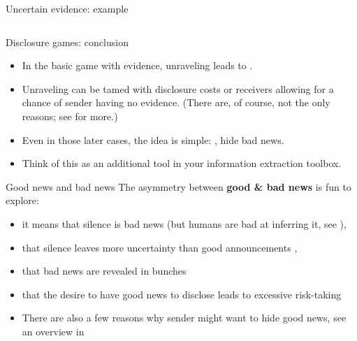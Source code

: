 \documentclass[english,10pt
,aspectratio=169
]{beamer}
\begin{document}
\begin{frame}{Uncertain evidence: example}
\begin{columns}
\begin{column}{0.4\linewidth}
	\end{column}
\end{columns}
\end{frame}


\begin{frame}{Disclosure games: conclusion}
\begin{itemize}
	\item In the basic game with evidence, unraveling leads to .
	\item Unraveling can be tamed with disclosure costs or receivers allowing for a chance of sender having no evidence. (There are, of course, not the only reasons; see \cite{dranove_quality_2010} for more.)
	\item Even in those later cases, the idea is simple: , \alert{hide bad news}.
	\item Think of this as an additional tool in your information extraction toolbox.
\end{itemize}
\end{frame}


\begin{frame}{Good news and bad news}
	The asymmetry between \textbf{good \& bad news} is fun to explore:
	\begin{itemize}[<+->]
		\item it means that \alert{silence is bad news} (but humans are bad at inferring it, see \cite*{jin_is_2021}), 
		\item that \alert{silence leaves more uncertainty} than good announcements \citep{shin_disclosures_2003}, 
		\item that bad news are revealed in \alert{bunches} \citep*{acharya_endogenous_2011}
		\item that the desire to have good news to disclose leads to \alert{excessive risk-taking} \citep*{ben-porath_disclosure_2018} %
		
		\bigskip 
		\item There are also a few reasons why sender might want to hide good news, see an overview in \cite{smirnov_bad_2022}
	\end{itemize}
\end{frame}
\end{document}
